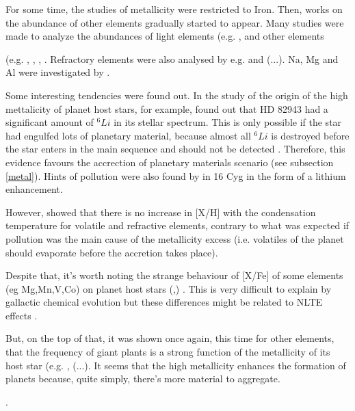 \documentclass[dvips,12pt,a4paper]{report}
\begin{document}
For some time, the studies of metallicity were restricted to Iron. Then, works on the abundance of other elements gradually started to appear.
Many studies were made to analyze the abundances of light elements (e.g. \citet{Israelian-2003}, \citet{Sandquist-2002} and other elements {(e.g. \citet{Gonzalez-2001}, \citet{Fischer-2005}, \citet{Takeda-2001}, \citet{Ecuvillon-2004b}. Refractory elements were also analysed by e.g. \citet{Bodaghee-2003} and \citet{Gilli-2006} (...). Na, Mg and Al were investigated by \citet{Beirao-2005}. 

Some interesting tendencies were found out. In the study of the origin of the high mettalicity of planet host stars, for example, \citet{Israelian-2003} found out that HD 82943 had a significant amount of $^6Li$ in its stellar spectrum. This is only possible if the star had engulfed lots of planetary material, because almost all $^6Li$ is destroyed before the star enters in the main sequence and should not be detected \citep{Sandquist-2002}. Therefore, this evidence favours the accrection of planetary materials scenario (see subsection \ref{metal}). Hints of pollution were also found by \citet{Laws-2001} in 16 Cyg  in the form of a lithium enhancement.

However, \citet{Ecuvillon-2006b} showed that there is no increase in [X/H] with the condensation temperature for volatile and refractive elements, contrary to what was expected if pollution was the main cause of the metallicity excess (i.e. volatiles of the planet should evaporate before the accretion takes place). 

Despite that, it's worth noting the strange behaviour of [X/Fe] of some elements (eg Mg,Mn,V,Co) on planet host stars (\citet{Bodaghee-2003},\citet{Gilli-2006}) . This is very difficult to explain by gallactic chemical evolution but these differences might be related to NLTE effects \citep{Bodaghee-2003}.

But, on the top of that, it was shown once again, this time for other elements, that the frequency of giant plants is a strong function of the metallicity of its host star (e.g. \citet{Fischer-2005}, \citet{Gilli-2006} (...). It seems that the high metallicity enhances the formation of planets because, quite simply, there's more material to aggregate.

. %

}
\end{document}
